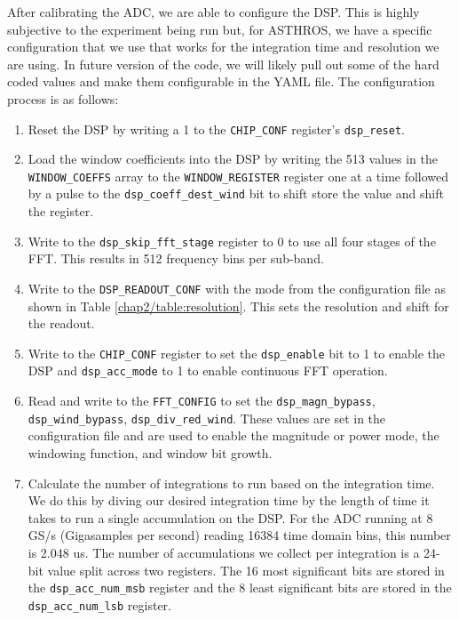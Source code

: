 After calibrating the ADC, we are able to configure the DSP. 
This is highly subjective to the experiment being run but, for ASTHROS, we have a specific configuration that we use that works for the integration time and resolution we are using. 
In future version of the code, we will likely pull out some of the hard coded values and make them configurable in the YAML file.
The configuration process is as follows:
\begin{enumerate}
    \item Reset the DSP by writing a 1 to the \texttt{CHIP\_CONF} register's \texttt{dsp\_reset}.
    \item Load the window coefficients into the DSP by writing the 513 values in the \texttt{WINDOW\_COEFFS} array to the \texttt{WINDOW\_REGISTER} register one at a time followed by a pulse to the \texttt{dsp\_coeff\_dest\_wind} bit to shift store the value and shift the register.
    \item 
        Write to the \texttt{dsp\_skip\_fft\_stage} register to 0 to use all four stages of the FFT. 
        This results in 512 frequency bins per sub-band. 
    \item 
        Write to the \texttt{DSP\_READOUT\_CONF} with the mode from the configuration file as shown in Table \ref{chap2/table:resolution}. 
        This sets the resolution and shift for the readout.
    \item 
        Write to the \texttt{CHIP\_CONF} register to set the \texttt{dsp\_enable} bit to 1 to enable the DSP and \texttt{dsp\_acc\_mode} to 1 to enable continuous FFT operation. 
    \item 
        Read and write to the \texttt{FFT\_CONFIG} to set the \texttt{dsp\_magn\_bypass}, \texttt{dsp\_wind\_bypass}, \texttt{dsp\_div\_red\_wind}. 
        These values are set in the configuration file and are used to enable the magnitude or power mode, the windowing function, and window bit growth. 
    \item 
        Calculate the number of integrations to run based on the integration time. 
        We do this by diving our desired integration time by the length of time it takes to run a single accumulation on the DSP. 
        For the ADC running at 8 GS/s (Gigasamples per second) reading 16384 time domain bins, this number is 2.048 us.
        The number of accumulations we collect per integration is a 24-bit value split across two registers. 
        The 16 most significant bits are stored in the \texttt{dsp\_acc\_num\_msb} register and the 8 least significant bits are stored in the \texttt{dsp\_acc\_num\_lsb} register.

\end{enumerate}
